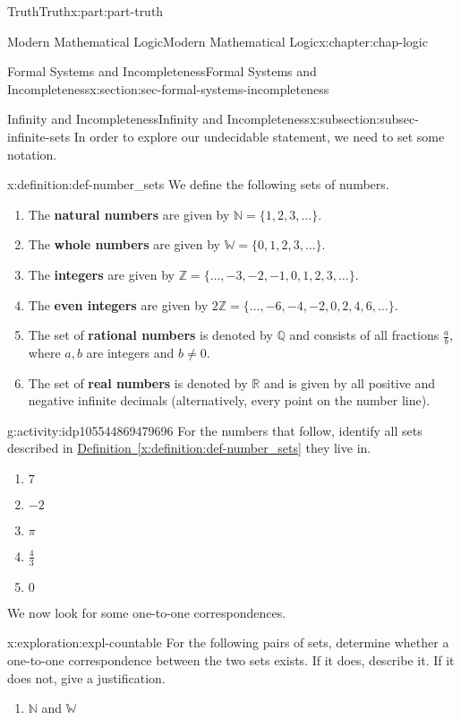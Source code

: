 \documentclass[oneside,10pt,]{book}
\newcommand{\xreffont}{\relax}
\newcommand{\terminology}[1]{\textbf{#1}}
\numberwithin{equation}{section}
\begin{document}
\begin{partptx}{Truth}{}{Truth}{}{}{x:part:part-truth}
\begin{chapterptx}{Modern Mathematical Logic}{}{Modern Mathematical Logic}{}{}{x:chapter:chap-logic}
\begin{sectionptx}{Formal Systems and Incompleteness}{}{Formal Systems and Incompleteness}{}{}{x:section:sec-formal-systems-incompleteness}
\begin{subsectionptx}{Infinity and Incompleteness}{}{Infinity and Incompleteness}{}{}{x:subsection:subsec-infinite-sets}
In order to explore our undecidable statement, we need to set some notation.%
\begin{definition}{}{x:definition:def-number_sets}%
We define the following sets of numbers.%
%
\begin{enumerate}
\item{}The \terminology{natural numbers} are given by \(\mathbb{N} = \{1, 2, 3, \ldots\}\).%
\item{}The \terminology{whole numbers} are given by \(\mathbb{W} = \{0,1,2,3,\ldots\}\).%
\item{}The \terminology{integers} are given by \(\mathbb{Z} = \{\ldots, -3, -2, -1, 0, 1, 2, 3, \ldots\}\).%
\item{}The \terminology{even integers} are given by \(2\mathbb{Z} = \{\ldots, -6, -4, -2, 0, 2, 4, 6, \ldots\}\).%
\item{}The set of \terminology{rational numbers} is denoted by \(\mathbb{Q}\) and consists of all fractions \(\frac{a}{b}\), where \(a,b\) are integers and \(b\ne 0\).%
\item{}The set of \terminology{real numbers} is denoted by \(\mathbb{R}\) and is given by all positive and negative infinite decimals (alternatively, every point on the number line).%
\end{enumerate}
\end{definition}
\begin{activity}{}{g:activity:idp105544869479696}%
For the numbers that follow, identify all sets described in \hyperref[x:definition:def-number_sets]{Definition~{\xreffont\ref{x:definition:def-number_sets}}} they live in.%
%
\begin{enumerate}
\item{}\(\displaystyle 7\)%
\item{}\(\displaystyle -2\)%
\item{}\(\displaystyle \pi\)%
\item{}\(\displaystyle \frac{4}{3}\)%
\item{}\(\displaystyle 0\)%
\end{enumerate}
\end{activity}%
We now look for some one-to-one correspondences.%
\begin{exploration}{}{x:exploration:expl-countable}%
For the following pairs of sets, determine whether a one-to-one correspondence between the two sets exists. If it does, describe it. If it does not, give a justification.%
%
\begin{enumerate}
\item{}\(\mathbb{N}\) and \(\mathbb{W}\)%

\end{enumerate}
\end{exploration}
\end{subsectionptx}
\end{sectionptx}
\end{chapterptx}
\end{partptx}
\end{document}
